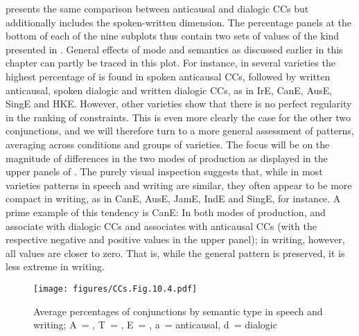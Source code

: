  presents the same comparison between anticausal and dialogic CCs but additionally includes the spoken-written dimension. The percentage panels at the bottom of each of the nine subplots thus contain two sets of values of the kind presented in . General effects of mode and semantics as discussed earlier in this chapter can partly be traced in this plot. For instance, in several varieties the highest percentage of  is found in spoken anticausal CCs, followed by written anticausal, spoken dialogic and written dialogic CCs, as in IrE, CanE, AusE, SingE and HKE. However, other varieties show that there is no perfect regularity in the ranking of constraints. This is even more clearly the case for the other two conjunctions, and we will therefore turn to a more general assessment of patterns, averaging across conditions and groups of varieties. The focus will be on the magnitude of differences in the two modes of production as displayed in the upper panels of . The purely visual inspection suggests that, while in most varieties patterns in speech and writing are similar, they often appear to be more compact in writing, as in CanE, AusE, JamE, IndE and SingE, for instance. A prime example of this tendency is CanE: In both modes of production,  and  associate with dialogic CCs and  associates with anticausal CCs (with the respective negative and positive values in the upper panel); in writing, however, all values are closer to zero. That is, while the general pattern is preserved, it is less extreme in writing.

\begin{figure}
\texttt{[image: figures/CCs.Fig.10.4.pdf]}
\caption{\label{bkm:Ref59994927}\label{fig:10.4}Average percentages of conjunctions by semantic type in speech and writing; A~= , T~= , E~= , a~= anticausal, d~= dialogic}
\end{figure}

